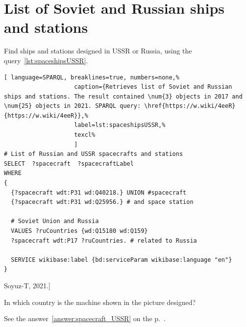 \section{List of Soviet and Russian ships and stations}

Find ships and stations designed in USSR or Russia, using the query~\ref{lst:spaceshipsUSSR}.

\begin{lstlisting}[ language=SPARQL, breaklines=true, numbers=none,%
                    caption={Retrieves list of Soviet and Russian ships and stations. The result contained \num{3} objects in 2017 and \num{25} objects in 2021. SPARQL query: \href{https://w.wiki/4eeR}{https://w.wiki/4eeR}},%
                    label=lst:spaceshipsUSSR,%
                    texcl%
                    ]
# List of Russian and USSR spacecrafts and stations
SELECT  ?spacecraft  ?spacecraftLabel 
WHERE
{
  {?spacecraft wdt:P31 wd:Q40218.} UNION #spacecraft
  {?spacecraft wdt:P31 wd:Q25956.} # and space station
  
  # Soviet Union and Russia
  VALUES ?ruCountries {wd:Q15180 wd:Q159}
  ?spacecraft wdt:P17 ?ruCountries. # related to Russia
  
  SERVICE wikibase:label {bd:serviceParam wikibase:language "en"}
}
\end{lstlisting}%

\begin{marginfigure}
{
	\setlength{\fboxsep}{0pt}%
	\setlength{\fboxrule}{1pt}%
}
\caption
[Soyuz-T, 2021.]{%
In which country is the machine shown in the picture designed?

See the answer~\ref{answer:spacecraft_USSR} on the p.~\pageref{answer:spacecraft_USSR}.
}
\label{question:spacecraft_soyuzT}
\end{marginfigure}


